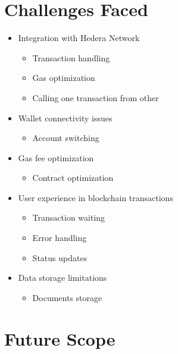 \documentclass[12pt,a4paper]{article}
\begin{document}
    \section{Challenges Faced}
    \begin{itemize}
        \item Integration with Hedera Network
        \begin{itemize}
            \item Transaction handling
            \item Gas optimization
            \item Calling one transaction from other
        \end{itemize}

        \item Wallet connectivity issues
        \begin{itemize}
            \item Account switching
        \end{itemize}

        \item Gas fee optimization
        \begin{itemize}
            \item Contract optimization
        \end{itemize}

        \item User experience in blockchain transactions
        \begin{itemize}
            \item Transaction waiting
            \item Error handling
            \item Status updates
        \end{itemize}

        \item Data storage limitations
        \begin{itemize}
            \item Documents storage
        \end{itemize}
    \end{itemize}


    \section{Future Scope}
\end{document}
